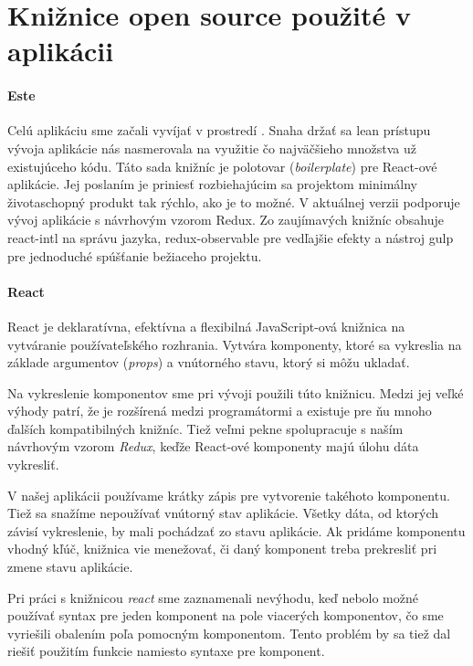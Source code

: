 \section{Knižnice open source použité v aplikácii}%

\label{sec:kniznice}

\paragraph{Este}
Celú aplikáciu sme začali vyvíjať v prostredí \cite[este]{Este}. Snaha držať sa lean prístupu vývoja aplikácie nás nasmerovala na využitie čo najväčšieho množstva už existujúceho kódu. Táto sada knižníc je polotovar (\emph{boilerplate}) pre React-ové aplikácie. Jej poslaním je priniesť rozbiehajúcim sa projektom minimálny životaschopný produkt tak rýchlo, ako je to možné. V aktuálnej verzii podporuje vývoj aplikácie s návrhovým vzorom Redux. Zo zaujímavých knižníc obsahuje react-intl na správu jazyka, redux-observable pre vedľajšie efekty a nástroj gulp pre jednoduché spúšťanie bežiaceho projektu.

\paragraph{React}
React \cite{react} je deklaratívna, efektívna a flexibilná JavaScript-ová knižnica na vytváranie používateľského rozhrania. Vytvára komponenty, ktoré sa vykreslia na základe argumentov (\emph{props}) a vnútorného stavu, ktorý si môžu ukladať. 

Na vykreslenie komponentov sme pri vývoji použili túto knižnicu. Medzi jej veľké výhody patrí, že je rozšírená medzi programátormi a existuje pre ňu mnoho ďalších kompatibilných knižníc. Tiež veľmi pekne spolupracuje s naším návrhovým vzorom \emph{Redux}, keďže React-ové komponenty majú úlohu dáta vykresliť.

V našej aplikácii používame krátky zápis pre vytvorenie takéhoto komponentu. Tiež sa snažíme nepoužívať vnútorný stav aplikácie. Všetky dáta, od ktorých závisí vykreslenie, by mali pochádzať zo stavu aplikácie. Ak pridáme komponentu vhodný kľúč, knižnica vie menežovať, či daný komponent treba prekresliť pri zmene stavu aplikácie.

Pri práci s knižnicou \emph{react} sme zaznamenali nevýhodu, keď nebolo možné používať syntax pre jeden komponent na pole viacerých komponentov, čo sme vyriešili obalením poľa pomocným komponentom. Tento problém by sa tiež dal riešiť použitím funkcie namiesto syntaxe pre komponent.

